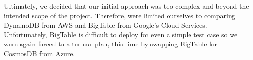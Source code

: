 Ultimately, we decided that our initial approach was too complex and beyond the intended scope of the project.  Therefore, were limited ourselves to comparing DynamoDB from AWS and BigTable from Google's Cloud Services.  Unfortunately, BigTable is difficult to deploy for even a simple test case so we were again forced to alter our plan, this time by swapping BigTable for CosmosDB from Azure.




























